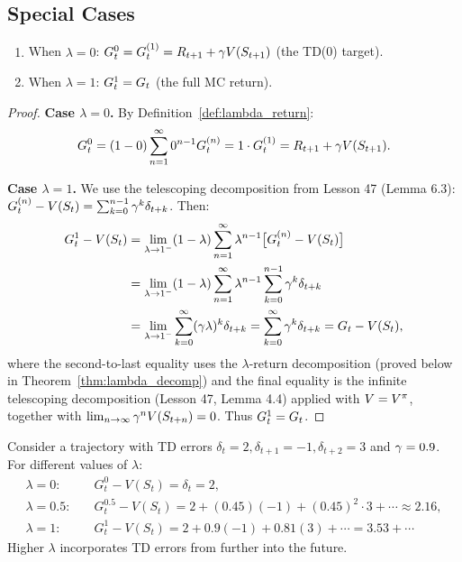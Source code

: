 \documentclass[11pt,a4paper]{article}
\begin{document}
\subsection{Special Cases}
\label{subsec:special_cases}

\begin{proposition}
\label{prop:lambda_special}
\begin{enumerate}
  \item When $\lambda = 0$:
    $G_t^0 = G_t^{(1)} = R_{t+1} + \gamma V(S_{t+1})$
    (the TD(0) target).
  \item When $\lambda = 1$: $G_t^1 = G_t$ (the full MC return).
\end{enumerate}
\end{proposition}

\begin{proof}
\textbf{Case $\lambda = 0$.} By Definition~\ref{def:lambda_return}:
\begin{equation}
  G_t^0 = (1 - 0)\sum_{n=1}^{\infty} 0^{n-1} G_t^{(n)}
  = 1 \cdot G_t^{(1)} = R_{t+1} + \gamma V(S_{t+1}).
\end{equation}

\textbf{Case $\lambda = 1$.}
We use the telescoping decomposition from Lesson 47
(Lemma 6.3): $G_t^{(n)} - V(S_t) = \sum_{k=0}^{n-1}
\gamma^k \delta_{t+k}$. Then:
\begin{align}
  G_t^1 - V(S_t)
  &= \lim_{\lambda \to 1^-} (1-\lambda) \sum_{n=1}^{\infty}
     \lambda^{n-1} \bigl[G_t^{(n)} - V(S_t)\bigr] \nonumber\\
  &= \lim_{\lambda \to 1^-} (1-\lambda) \sum_{n=1}^{\infty}
     \lambda^{n-1} \sum_{k=0}^{n-1} \gamma^k \delta_{t+k}
     \nonumber\\
  &= \lim_{\lambda \to 1^-} \sum_{k=0}^{\infty}
     (\gamma\lambda)^k \delta_{t+k}
   = \sum_{k=0}^{\infty} \gamma^k \delta_{t+k}
   = G_t - V(S_t),
  \label{eq:lambda1_proof}
\end{align}
where the second-to-last equality uses the $\lambda$-return
decomposition (proved below in Theorem~\ref{thm:lambda_decomp})
and the final equality is the infinite telescoping decomposition
(Lesson 47, Lemma 4.4) applied with $V = V^{\pi}$, together with
$\lim_{n \to \infty} \gamma^n V(S_{t+n}) = 0$.
Thus $G_t^1 = G_t$.
\end{proof}

\begin{example}
\label{ex:lambda_interp}
Consider a trajectory with TD errors
$\delta_t = 2, \delta_{t+1} = -1, \delta_{t+2} = 3$ and
$\gamma = 0.9$. For different values of $\lambda$:
\begin{align*}
  \lambda = 0: &\quad G_t^0 - V(S_t) = \delta_t = 2, \\
  \lambda = 0.5: &\quad G_t^{0.5} - V(S_t)
    = 2 + (0.45)(-1) + (0.45)^2 \cdot 3 + \cdots \approx 2.16, \\
  \lambda = 1: &\quad G_t^1 - V(S_t)
    = 2 + 0.9(-1) + 0.81(3) + \cdots = 3.53 + \cdots
\end{align*}
Higher $\lambda$ incorporates TD errors from further into the future.
\end{example}
\end{document}
